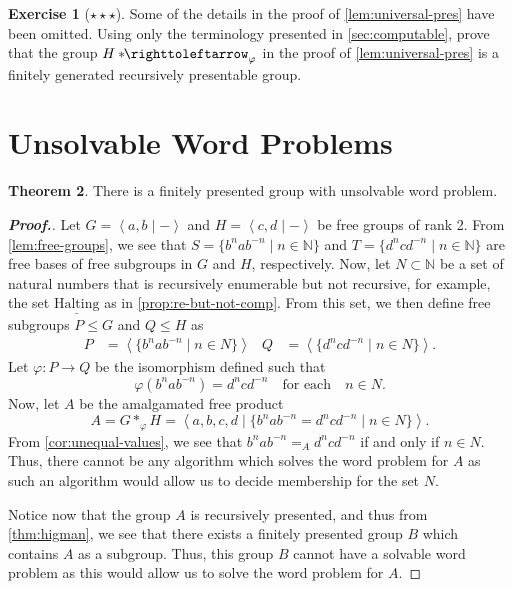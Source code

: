\documentclass[11pt,a4paper,reqno]{amsart}
\theoremstyle{plain}
\theoremstyle{definition}
\newtheorem{theorem}{Theorem}[section]
\theoremstyle{definition}
\newtheorem{exercise}[theorem]{Exercise}
\renewcommand\leq\leqslant
\newenvironment{myproof}{\begin{proof}[\normalfont\bfseries Proof.]}{\end{proof}}
\newcommand\hnn{*\!\!\righttoleftarrow}
\newcommand\exerciseLevelHard{$\star${\,}$\star${\,}$\star$}
\begin{document}
\begin{exercise}[\exerciseLevelHard]
	Some of the details in the proof of \cref{lem:universal-pres} have been omitted.
	Using only the terminology presented in \cref{sec:computable}, prove that the group $H\hnn_\varphi$ in the proof of \cref{lem:universal-pres} is a finitely generated recursively presentable group.
\end{exercise}

\section{Unsolvable Word Problems}

\begin{theorem}\label{thm:unsolvable-wp}
	There is a finitely presented group with unsolvable word problem.
\end{theorem}

\begin{myproof}
	Let $G = \left\langle a,b \mid - \right\rangle$ and $H = \left\langle c,d \mid - \right\rangle$ be free groups of rank 2.
	From \cref{lem:free-groups}, we see that $S = \{ b^n a b^{-n} \mid n\in \mathbb N \}$ and $T = \{ d^n c d^{-n} \mid n\in \mathbb N \}$ are free bases of free subgroups in $G$ and $H$, respectively.
	Now, let $N\subset \mathbb N$ be a set of natural numbers that is recursively enumerable but not recursive, for example, the set $\underline{\mathrm{Halting}}$ as in \cref{prop:re-but-not-comp}.
	From this set, we then define free subgroups $P\leq G$ and $Q\leq H$ as
	\begin{align*}
		P & = \left\langle \{b^n a b^{-n} \mid n \in N\} \right\rangle  &
		Q & = \left\langle \{d^n c d^{-n} \mid n \in N \}\right\rangle.
	\end{align*}
	Let $\varphi\colon P \to Q$ be the isomorphism defined such that
	\[
		\varphi(b^n a b^{-n}) = d^n c d^{-n}
		\quad\text{for each}\quad n \in N.
	\]
	Now, let $A$ be the amalgamated free product
	\[
		A
		=
		G*_\varphi H
		=
		\left\langle
		a,b,c,d
		\mid
		\{
		b^n a b^{-n}
		=
		d^n c d^{-n}
		\mid
		n \in N
		\}
		\right\rangle.
	\]
	From \cref{cor:unequal-values}, we see that $b^n a b^{-n} =_A d^n c d^{-n}$ if and only if $n \in N$.
	Thus, there cannot be any algorithm which solves the word problem for $A$ as such an algorithm would allow us to decide membership for the set $N$.

	Notice now that the group $A$ is recursively presented, and thus from \cref{thm:higman}, we see that there exists a finitely presented group $B$ which contains $A$ as a subgroup.
	Thus, this group $B$ cannot have a solvable word problem as this would allow us to solve the word problem for $A$.
\end{myproof}
\end{document}
